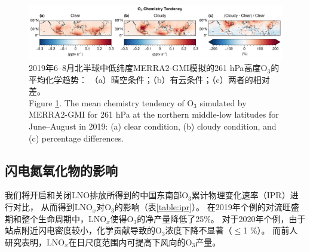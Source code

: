 \begin{figure}[H]
    \centering
    \includegraphics[width=\textwidth]{./figures/uto3_chem_tendency.png}
    \caption{
    2019年6--8月北半球中低纬度MERRA2-GMI模拟的261 hPa高度O$_3$的平均化学趋势：
    （a）晴空条件；（b）有云条件；（c）两者的相对差。\\
    Figure \ref{fig:uto3_chem_tendency}. The mean chemistry tendency of O$_3$ simulated by MERRA2-GMI for 261 hPa at the northern middle-low latitudes for June--August in 2019:
    (a) clear condition, (b) cloudy condition, and (c) percentage differences.
    }
    \label{fig:uto3_chem_tendency}
\end{figure}

\subsection{闪电氮氧化物的影响} \label{sec:lnox_effects}

我们将开启和关闭LNO排放所得到的中国东南部O$_3$累计物理变化速率（IPR）进行对比，
从而得到LNO$_x$对O$_3$的影响（表\ref{table:ipr}）。
在2019年个例的对流旺盛期和整个生命周期中，LNO$_x$使得O$_3$的净产量降低了25\%。
对于2020年个例，由于站点附近闪电密度较小，化学贡献导致的O$_3$浓度下降不显著（$\leq$1 \%）。
而前人研究表明，LNO$_x$在日尺度范围内可提高下风向的O$_3$产量\citep{Pickering.1996,DeCaria.2005}。


